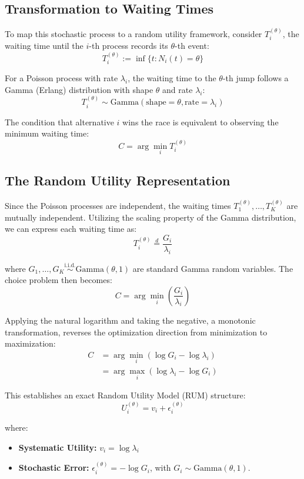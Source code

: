 \documentclass[
  man,
  floatsintext,
  longtable,
  a4paper,
  nolmodern,
  notxfonts,
  notimes,
  colorlinks=true,linkcolor=blue,citecolor=blue,urlcolor=blue]{apa7}
\providecommand{\tightlist}{%
  \setlength{\itemsep}{0pt}\setlength{\parskip}{0pt}}
\begin{document}
\subsection{Transformation to Waiting
Times}\label{transformation-to-waiting-times}

To map this stochastic process to a random utility framework, consider
\(T_i^{(\theta)}\), the waiting time until the \(i\)-th process records
its \(\theta\)-th event: \[
T_i^{(\theta)} := \inf \{t : N_i(t) = \theta \}
\]

For a Poisson process with rate \(\lambda_i\), the waiting time to the
\(\theta\)-th jump follows a Gamma (Erlang) distribution with shape
\(\theta\) and rate \(\lambda_i\): \[
T_i^{(\theta)} \sim \text{Gamma}(\text{shape}=\theta, \text{rate}=\lambda_i)
\]

The condition that alternative \(i\) wins the race is equivalent to
observing the minimum waiting time: \[
C = \arg \min_{i} T_i^{(\theta)}
\]

\subsection{The Random Utility
Representation}\label{the-random-utility-representation}

Since the Poisson processes are independent, the waiting times
\(T_1^{(\theta)}, \ldots, T_K^{(\theta)}\) are mutually independent.
Utilizing the scaling property of the Gamma distribution, we can express
each waiting time as: \[
T_i^{(\theta)} \stackrel{d}{=} \frac{G_i}{\lambda_i}
\]

where
\(G_1, \ldots, G_K \stackrel{\text{i.i.d.}}{\sim} \text{Gamma}(\theta, 1)\)
are standard Gamma random variables. The choice problem then becomes: \[
C = \arg \min_{i} \left( \frac{G_i}{\lambda_i} \right)
\]

Applying the natural logarithm and taking the negative, a monotonic
transformation, reverses the optimization direction from minimization to
maximization: \[
\begin{aligned} C &= \arg \min_{i} (\log G_i - \log \lambda_i) \\ &= \arg \max_{i} (\log \lambda_i - \log G_i) \end{aligned}
\]

This establishes an exact Random Utility Model (RUM) structure: \[
U_i^{(\theta)} = v_i + \epsilon_i^{(\theta)}
\]

where:

\begin{itemize}
\tightlist
\item
  \textbf{Systematic Utility:} \(v_i = \log \lambda_i\)\\
\item
  \textbf{Stochastic Error:} \(\epsilon_i^{(\theta)} = -\log G_i\), with
  \(G_i \sim \text{Gamma}(\theta, 1)\).
\end{itemize}
\end{document}
